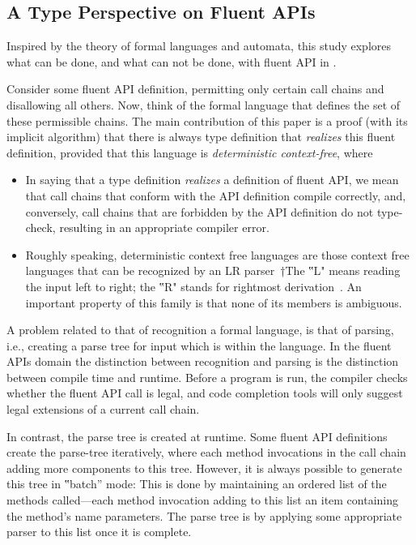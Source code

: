 \subsection{A Type Perspective on Fluent APIs}
Inspired by the theory of formal languages and automata,
this study explores what can be done, and what can not be done, with fluent API in \Java.

Consider some fluent API definition, permitting only certain call
chains and disallowing all others.
Now, think of the formal language that defines the set of these permissible chains.
The main contribution of this paper is a proof (with its implicit algorithm) that
there is always \Java type definition that \emph{realizes} this fluent definition, provided that this
language is \emph{deterministic context-free}, where
\begin{itemize}
  \item In saying that a type definition \emph{realizes} a definition of fluent
    API, we mean that call chains that conform with the API definition compile
    correctly, and, conversely, call chains that are forbidden by the API
    definition do not type-check, resulting in an appropriate compiler error.
  \item Roughly speaking, deterministic context free languages are those
    context free languages that can be recognized by an LR parser~†{The ‟L"
    means reading the input left to right; the ‟R" stands for rightmost derivation}~\cite{Aho:86}.
    An important property of this family is that none of its members is ambiguous.
\end{itemize}

A problem related to that of recognition a formal language,
  is that of parsing, i.e., creating a parse tree for input which is within the language.
In the fluent APIs domain the distinction between recognition and parsing is
  the distinction between compile time and runtime.
Before a program is run, the compiler checks whether the fluent API call is legal,
  and code completion tools will only suggest legal extensions of a current call chain.

In contrast, the parse tree is created at runtime.
Some fluent API definitions create the parse-tree
  iteratively, where each method invocations in the call chain adding
  more components to this tree.
However, it is always possible to generate this tree in ‟batch” mode:
This is done by maintaining an ordered list of the methods
  called---each method invocation adding to this list an item containing the method's name
  parameters.
The parse tree is by applying some appropriate parser to this list
  once it is complete.

